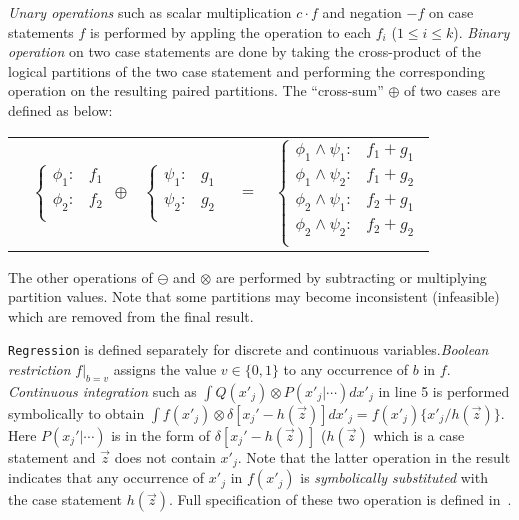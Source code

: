 \emph{Unary operations} such as scalar multiplication $c\cdot f$ %
and negation $-f$ on case statements $f$ is performed by appling the operation to each
$f_i$ ($1 \leq i \leq k$). 
\emph{Binary operation} on two case statements are done by taking the cross-product
of the logical partitions of the two case statement and performing the
corresponding operation on the resulting paired partitions.  
The ``cross-sum'' $\oplus$ of two cases are defined as below:

{\footnotesize 
\begin{center}
\begin{tabular}{r c c c l}
&
\hspace{-6mm} 
  $\begin{cases}
    \phi_1: & f_1 \\ 
    \phi_2: & f_2 \\ 
  \end{cases}$
$\oplus$
&
\hspace{-4mm}
  $\begin{cases}
    \psi_1: & g_1 \\ 
    \psi_2: & g_2 \\ 
  \end{cases}$
&
\hspace{-2mm} 
$ = $
&
\hspace{-2mm}
  $\begin{cases}
  \phi_1 \wedge \psi_1: & f_1 + g_1 \\ 
  \phi_1 \wedge \psi_2: & f_1 + g_2 \\ 
  \phi_2 \wedge \psi_1: & f_2 + g_1 \\ 
  \phi_2 \wedge \psi_2: & f_2 + g_2 \\ 
  \end{cases}$
\end{tabular}
\end{center}
}
\normalsize

The other operations of $\ominus$ and $\otimes$ are performed by subtracting or multiplying partition values.  Note that some partitions may become inconsistent (infeasible)  which are removed from the final result. 

\texttt{Regression} is defined separately for discrete and continuous variables.\emph{Boolean restriction} $f|_{b=v}$ assigns the value $v \in \{ 0,1 \}$ to any occurrence of $b$ in $f$. \emph{Continuous integration} such as $\int Q(x'_j) \otimes P(x'_j|\cdots) dx'_j$ in line 5 is performed symbolically to obtain $\int f(x'_j) \otimes \delta[x_j' - h(\vec{z})] dx'_j = f(x'_j) \{ x'_j / h(\vec{z}) \}$. Here $P(x_j'|\cdots)$ is in the form of $\delta[x_j' - h(\vec{z})]$ ($h(\vec{z})$ which is a case statement and $\vec{z}$ does not contain $x'_j$. Note that the latter operation in the result indicates that any occurrence of $x'_j$ in $f(x'_j)$ is \emph{symbolically substituted} with the case statement $h(\vec{z})$.
Full specification of these two operation is defined in~\cite{sanner_uai11}. 

